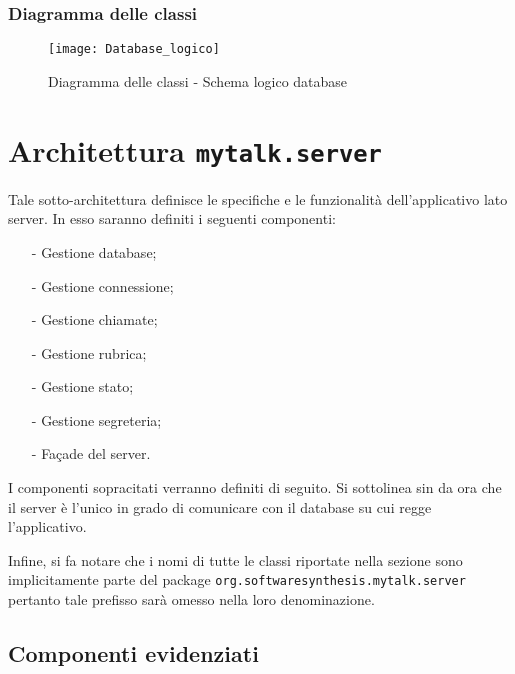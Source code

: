 \subsubsection{Diagramma delle classi}
\begin{figure}[H]
\begin{center}
\texttt{[image: Database\_logico]}
\caption{Diagramma delle classi - Schema logico database}\label{fig:database_logico}
\end{center}
\end{figure}

\clearpage

\section{Architettura \texttt{mytalk.server}}\label{sec:server}
Tale sotto-architettura definisce le specifiche e le funzionalità dell'applicativo lato server. In esso saranno definiti i seguenti componenti:
\begin{itemize}[noitemsep,nolistsep]
	\item[-] Gestione database;
	\item[-] Gestione connessione;
	\item[-] Gestione chiamate;
	\item[-] Gestione rubrica;
	\item[-] Gestione stato;
	\item[-] Gestione segreteria;
	\item[-] Façade del server.
\end{itemize}

I componenti sopracitati verranno definiti di seguito. Si sottolinea sin da ora che il server è l'unico in grado di comunicare con il database su cui regge l'applicativo.

Infine, si fa notare che i nomi di tutte le classi riportate nella sezione sono implicitamente parte del package \texttt{org.softwaresynthesis.mytalk.server} pertanto tale prefisso sarà omesso nella loro denominazione.

\subsection{Componenti evidenziati}

